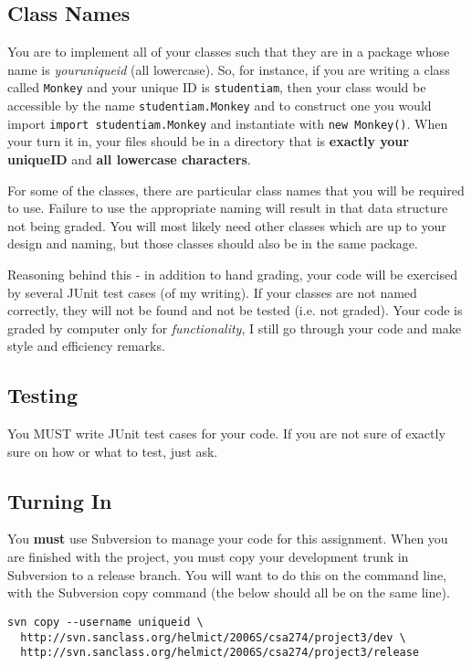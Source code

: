 \documentclass[10pt]{exam}
\begin{document}
\subsection{Class Names}
You are to implement all of your classes such that they are in a package whose name is {\it youruniqueid} (all lowercase).  So, for instance, if you are writing a class called {\tt Monkey} and your unique ID is {\tt studentiam}, then your class would be accessible by the name {\tt studentiam.Monkey} and to construct one you would import {\tt import studentiam.Monkey} and instantiate with {\tt new Monkey()}.  When your turn it in, your files should be in a directory that is {\bf exactly your uniqueID} and {\bf all lowercase characters}.
\par
For some of the classes, there are particular class names that you will be required to use.   Failure to use the appropriate naming will result in that data structure not being graded.  You will most likely need other classes which are up to your design and naming, but those classes should also be in the same package.
\par
Reasoning behind this - in addition to hand grading, your code will be exercised by several JUnit test cases (of my writing).   If your classes are not named correctly, they will not be found and not be tested (i.e. not graded).  Your code is graded by computer only for {\it functionality}, I still go through your code and make style and efficiency remarks.

\subsection{Testing}
You MUST write JUnit test cases for your code.   If you are not sure of exactly sure on how or what to test, just ask.

\subsection{Turning In}
You {\bf must} use Subversion to manage your code for this assignment.  When you are finished with the project, you must copy your development trunk in Subversion to a release branch.   You will want to do this on the command line, with the Subversion copy command (the below should all be on the same line).  

\begin{verbatim}
svn copy --username uniqueid \
  http://svn.sanclass.org/helmict/2006S/csa274/project3/dev \
  http://svn.sanclass.org/helmict/2006S/csa274/project3/release
\end{verbatim}
\end{document}
